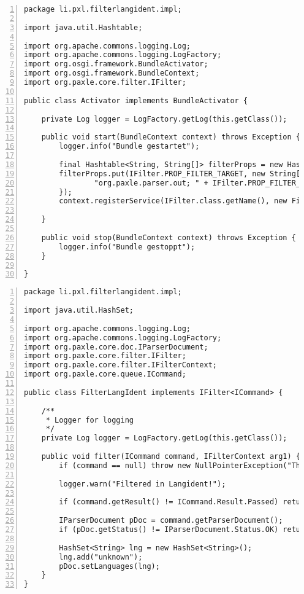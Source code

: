 \documentclass[a4paper,12pt]{scrartcl}
\begin{document}
\begin{lstlisting}[numbers=left, caption=Activator.java]
package li.pxl.filterlangident.impl;

import java.util.Hashtable;

import org.apache.commons.logging.Log;
import org.apache.commons.logging.LogFactory;
import org.osgi.framework.BundleActivator;
import org.osgi.framework.BundleContext;
import org.paxle.core.filter.IFilter;

public class Activator implements BundleActivator {

	private Log logger = LogFactory.getLog(this.getClass());
	
	public void start(BundleContext context) throws Exception {
		logger.info("Bundle gestartet");
		
		final Hashtable<String, String[]> filterProps = new Hashtable<String, String[]>();
		filterProps.put(IFilter.PROP_FILTER_TARGET, new String[] {
				"org.paxle.parser.out; " + IFilter.PROP_FILTER_TARGET_POSITION + "=" + (Integer.MAX_VALUE-1000)
		});
		context.registerService(IFilter.class.getName(), new FilterLangIdent(), filterProps);
		
	}

	public void stop(BundleContext context) throws Exception {
		logger.info("Bundle gestoppt");
	}

}
\end{lstlisting}
\begin{lstlisting}[numbers=left, caption=FilterLangIdent.java]
package li.pxl.filterlangident.impl;

import java.util.HashSet;

import org.apache.commons.logging.Log;
import org.apache.commons.logging.LogFactory;
import org.paxle.core.doc.IParserDocument;
import org.paxle.core.filter.IFilter;
import org.paxle.core.filter.IFilterContext;
import org.paxle.core.queue.ICommand;

public class FilterLangIdent implements IFilter<ICommand> {

	/**
	 * Logger for logging
	 */
	private Log logger = LogFactory.getLog(this.getClass());

	public void filter(ICommand command, IFilterContext arg1) {
		if (command == null) throw new NullPointerException("The command object is null.");

		logger.warn("Filtered in Langident!");
		
		if (command.getResult() != ICommand.Result.Passed) return;

		IParserDocument pDoc = command.getParserDocument();
		if (pDoc.getStatus() != IParserDocument.Status.OK) return;

		HashSet<String> lng = new HashSet<String>();
		lng.add("unknown");
		pDoc.setLanguages(lng);	
	}
}
\end{lstlisting}
\end{document}
